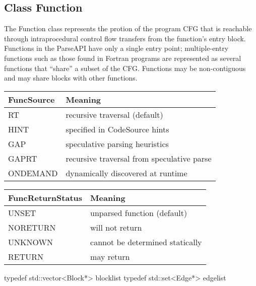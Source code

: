 \subsection{Class Function}


The Function class represents the protion of the program CFG that is reachable through intraprocedural control flow transfers from the function's entry block. Functions in the ParseAPI have only a single entry point; multiple-entry functions such as those found in Fortran programs are represented as several functions that ``share'' a subset of the CFG. Functions may be non-contiguous and may share blocks with other functions. 

\begin{center}
\begin{tabular}{ll}
\toprule
FuncSource & Meaning \\
\midrule
RT & recursive traversal (default) \\
HINT & specified in CodeSource hints \\
GAP & speculative parsing heuristics \\
GAPRT & recursive traversal from speculative parse \\
ONDEMAND & dynamically discovered at runtime \\
\bottomrule
\end{tabular}
\end{center}


\begin{center}
\begin{tabular}{ll}
\toprule
FuncReturnStatus & Meaning \\
\midrule
UNSET & unparsed function (default) \\
NORETURN & will not return \\
UNKNOWN & cannot be determined statically \\
RETURN & may return \\
\bottomrule
\end{tabular}
\end{center}


\begin{apient}
typedef std::vector<Block*> blocklist
typedef std::set<Edge*> edgelist
\end{apient}


